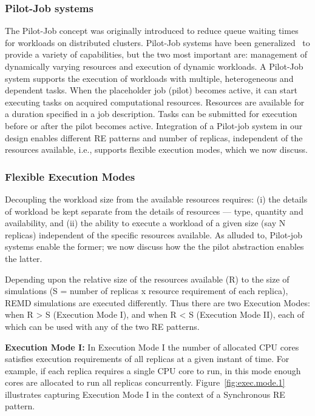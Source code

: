 \documentclass{sig-alternate-05-2015}
\begin{document}
\subsubsection{Pilot-Job systems} \label{pilot.job.systems}

The Pilot-Job concept was originally introduced to reduce queue waiting times for workloads on distributed clusters.  Pilot-Job systems have been generalized~\cite{review_pilotreview_2013} to provide a variety of capabilities, but the two most important are: management of dynamically varying resources and execution of dynamic workloads. A Pilot-Job system supports the execution of workloads with multiple, heterogeneous and dependent tasks\cite{review_radicalpilot_2015}. When the placeholder job (pilot) becomes active, it can start executing tasks on acquired computational resources. Resources are available for a duration specified in a job description. Tasks can be submitted for execution before or after the pilot becomes active. Integration of a Pilot-job system in our design enables different RE patterns and number of replicas, independent of the resources available, i.e., supports flexible execution modes, which we now discuss.

\subsubsection{Flexible Execution Modes} \label{fem}


Decoupling the workload size from the available resources requires: (i) the details of workload be kept separate from the details of resources --- type, quantity and availability, and (ii) the ability to execute a workload of a given size (say N replicas) independent of the specific resources available.  As alluded to, Pilot-job systems enable the former; we now discuss how the the pilot abstraction enables the latter.

Depending upon the relative size of the resources available (R) to the size of simulations (S = number of replicas x resource requirement of each replica), REMD simulations are executed differently. Thus there are two Execution Modes: when R > S (Execution Mode I), and when R < S (Execution Mode II), each of which can be used with any of the two RE patterns.

{\bf Execution Mode I:} In Execution Mode I the number of allocated CPU cores satisfies execution requirements of all replicas at a given instant of time. For example, if each replica requires a single CPU core to run, in this mode enough cores are allocated to run all replicas concurrently. Figure~\ref{fig:exec.mode.1} illustrates capturing Execution Mode I in the context of a Synchronous RE pattern.
\end{document}
